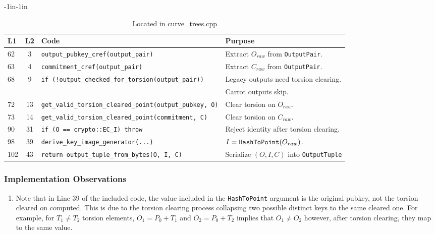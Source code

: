 \documentclass[12pt,titlepage,table]{article}
\begin{document}
\begin{table}[htbp]
\caption{output\_to\_tuple Source To Spec Map}
\begin{adjustwidth}{-1in}{-1in}
\centering
{
\begin{tabular}{| l | c | l | l |}
\hline
\textbf{L1} & \textbf{L2} & \textbf{Code} & \textbf{Purpose} \\
\hline
\hline
62 & 3 & \verb+output_pubkey_cref(output_pair)+ & Extract $O_{raw}$ from \verb+OutputPair+.\\
63 & 4 & \verb+commitment_cref(output_pair)+ & Extract $C_{raw}$ from \verb+OutputPair+. \\
68 & 9 & \verb+if (!output_checked_for_torsion(output_pair))+ & Legacy outputs need torsion clearing.\\
&&& Carrot outputs skip.\\
72 & 13 & \verb+get_valid_torsion_cleared_point(output_pubkey, O)+ & Clear torsion on $O_{raw}.$\\ 
73 & 14 & \verb+get_valid_torsion_cleared_point(commitment, C)+ & Clear torsion on $C_{raw}.$  \\
90 & 31 & \verb+if (O == crypto::EC_I) throw+& Reject identity after torsion clearing. \\
98 & 39 & \verb+derive_key_image_generator(...)+ & $I = \verb+HashToPoint+(O_{raw})$.\\
102 & 43 & \verb+return output_tuple_from_bytes(O, I, C)+ & Serialize $(O,I,C)$ into \verb+OutputTuple+ \\
\hline
\end{tabular}}
\end{adjustwidth}
\caption*{Located in curve\_trees.cpp}
\end{table}

\newpage
\subsubsection{Implementation Observations}
\begin{enumerate}
    \item Note that in Line 39 of the included code, the value included in the \verb+HashToPoint+ argument is the original pubkey, not the torsion cleared on computed. This is due to the torsion clearing process collapsing two possible distinct keys to the same cleared one. For example, for $T_1 \neq T_2$ torsion elements, $O_1 = P_0 + T_1$ and $O_2 = P_0 + T_2$ implies that $O_1 \neq O_2$ however, after torsion clearing, they map to the same value.
\end{enumerate}
\end{document}
